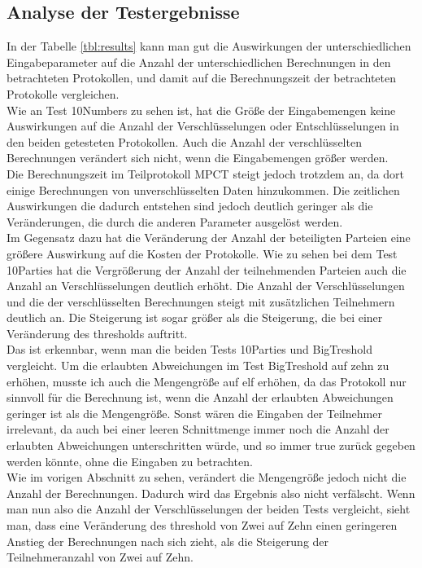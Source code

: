 \subsection{Analyse der Testergebnisse}
In der Tabelle \ref{tbl:results} kann man gut die Auswirkungen der unterschiedlichen Eingabeparameter auf die Anzahl der unterschiedlichen Berechnungen in den betrachteten Protokollen, und damit auf die Berechnungszeit der betrachteten Protokolle vergleichen.\\
Wie an Test 10Numbers zu sehen ist, hat die Größe der Eingabemengen keine Auswirkungen auf die Anzahl der Verschlüsselungen oder Entschlüsselungen in den beiden getesteten Protokollen. Auch die Anzahl der verschlüsselten Berechnungen verändert sich nicht, wenn die Eingabemengen größer werden.\\ Die Berechnungszeit im Teilprotokoll MPCT steigt jedoch trotzdem an, da dort einige Berechnungen von unverschlüsselten Daten hinzukommen. Die zeitlichen Auswirkungen die dadurch entstehen sind jedoch deutlich geringer als die Veränderungen, die durch die anderen Parameter ausgelöst werden.\\
Im Gegensatz dazu hat die Veränderung der Anzahl der beteiligten Parteien eine größere Auswirkung auf die Kosten der Protokolle. Wie zu sehen bei dem Test 10Parties hat die Vergrößerung der Anzahl der teilnehmenden Parteien auch die Anzahl an Verschlüsselungen deutlich erhöht. Die Anzahl der Verschlüsselungen und die der verschlüsselten Berechnungen steigt mit zusätzlichen Teilnehmern deutlich an. Die Steigerung ist sogar größer als die Steigerung, die bei einer Veränderung des thresholds auftritt.\\
Das ist erkennbar, wenn man die beiden Tests 10Parties und BigTreshold vergleicht. Um die erlaubten Abweichungen im Test BigTreshold auf zehn zu erhöhen, musste ich auch die Mengengröße auf elf erhöhen, da das Protokoll nur sinnvoll für die Berechnung ist, wenn die Anzahl der erlaubten Abweichungen geringer ist als die Mengengröße. Sonst wären die Eingaben der Teilnehmer irrelevant, da auch bei einer leeren Schnittmenge immer noch die Anzahl der erlaubten Abweichungen unterschritten würde, und so immer true zurück gegeben werden könnte, ohne die Eingaben zu betrachten.\\
Wie im vorigen Abschnitt zu sehen, verändert die Mengengröße jedoch nicht die Anzahl der Berechnungen. Dadurch wird das Ergebnis also nicht verfälscht.
Wenn man nun also die Anzahl der Verschlüsselungen der beiden Tests vergleicht, sieht man, dass eine Veränderung des threshold von Zwei auf Zehn einen geringeren Anstieg der Berechnungen nach sich zieht, als die Steigerung der Teilnehmeranzahl von Zwei auf Zehn.\\
